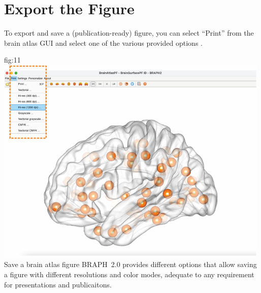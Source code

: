 \documentclass[justified]{tufte-handout}
\begin{document}
\clearpage
\section{Export the Figure}

To export and save a (publication-ready) figure, you can select ``Print'' from the brain atlas GUI and select one of the various provided options .

	{fig:11}
	{\includegraphics[height=10cm]{fig11.png}}
	{Save a brain atlas figure}
	{
	BRAPH~2.0 provides different options that allow saving a figure with different resolutions and color modes, adequate to any requirement for presentations and publicaitons.
	}
\end{document}

